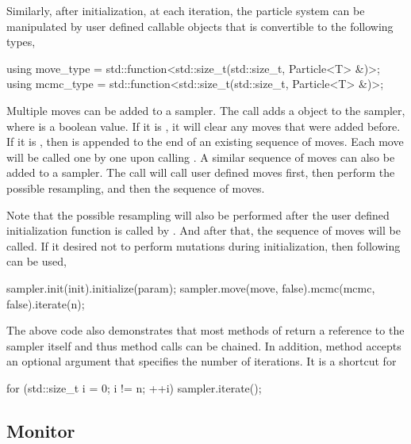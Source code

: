 Similarly, after initialization, at each iteration, the particle system can be
manipulated by user defined callable objects that is convertible to the
following types,
\begin{cppcode}
  using move_type = std::function<std::size_t(std::size_t, Particle<T> &)>;
  using mcmc_type = std::function<std::size_t(std::size_t, Particle<T> &)>;
\end{cppcode}
Multiple moves can be added to a sampler. The call
 adds a  object to
the sampler, where  is a boolean value. If it is
, it will clear any moves that were added before. If it is
, then  is appended to the end of an existing
sequence of moves. Each move will be called one by one upon calling
. A similar sequence of \mcmc moves can also be
added to a sampler. The call  will call user
defined moves first, then perform the possible resampling, and then the
sequence of \mcmc moves.

Note that the possible resampling will also be performed after the user defined
initialization function is called by . And
after that, the sequence of \mcmc moves will be called. If it desired not to
perform mutations during initialization, then following can be used,
\begin{cppcode}
  sampler.init(init).initialize(param);
  sampler.move(move, false).mcmc(mcmc, false).iterate(n);
\end{cppcode}
The above code also demonstrates that most methods of 
return a reference to the sampler itself and thus method calls can be chained.
In addition, method  accepts an optional argument
that specifies the number of iterations. It is a shortcut for
\begin{cppcode}
  for (std::size_t i = 0; i != n; ++i)
      sampler.iterate();
\end{cppcode}

\subsection{Monitor}
\label{sub:Monitor}

